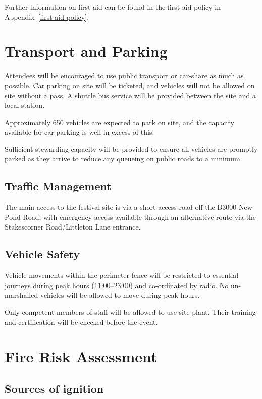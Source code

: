 Further information on first aid can be found in the first aid policy in Appendix~\ref{first-aid-policy}.

\section{Transport and Parking}

Attendees will be encouraged to use public transport or car-share as much as possible. Car parking on site will be ticketed,
and vehicles will not be allowed on site without a pass. A shuttle bus service will be provided between the site and a local station.

Approximately 650 vehicles are expected to park on site, and the capacity available for car parking is well in excess of this.

Sufficient stewarding capacity will be provided to ensure all vehicles are promptly parked as they arrive to reduce any queueing
on public roads to a minimum.

\subsection{Traffic Management}

The main access to the festival site is via a short access road off the B3000 New Pond Road, with emergency access available
through an alternative route via the Stakescorner Road/Littleton Lane entrance.

\subsection{Vehicle Safety}

Vehicle movements within the perimeter fence will be restricted to essential journeys during peak hours (11:00--23:00) and co-ordinated by radio. No un-marshalled vehicles will be allowed to move during peak hours.

Only competent members of staff will be allowed to use site plant. Their training and certification will be checked before the event.

\section{Fire Risk Assessment}
\label{fire}
\subsection{Sources of ignition}

